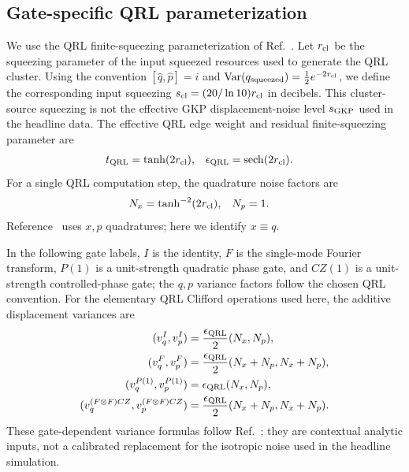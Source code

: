 \documentclass[aps,
prx,
superscriptaddress,
reprint,
longbibliography,
floatfix]{revtex4-2}
\begin{document}
\subsection{Gate-specific QRL parameterization}

We use the QRL finite-squeezing parameterization of Ref.~\cite{MenicucciQRL2020}. Let $r_{\rm cl}$ be the squeezing parameter of the input squeezed resources used to generate the QRL cluster. Using the convention $[\hat q,\hat p]=i$ and $\mathrm{Var}(q_{\rm squeezed})=\tfrac12 e^{-2r_{\rm cl}}$, we define the corresponding input squeezing $s_{\rm cl}=(20/\ln 10)r_{\rm cl}$ in decibels. This cluster-source squeezing is not the effective GKP displacement-noise level $s_{\rm GKP}$ used in the headline data. The effective QRL edge weight and residual finite-squeezing parameter are
\begin{align}
 t_{\rm QRL} &= \tanh(2r_{\rm cl}),
&
 \epsilon_{\rm QRL} &= \operatorname{sech}(2r_{\rm cl}).
\label{eq:qrl_t_epsilon}
\end{align}
For a single QRL computation step, the quadrature noise factors are
\begin{align}
 N_x &= \tanh^{-2}(2r_{\rm cl}),
&
 N_p &= 1 .
\label{eq:qrl_noise_factors}
\end{align}
Reference~\cite{MenicucciQRL2020} uses $x,p$ quadratures; here we identify $x\equiv q$.

In the following gate labels, $I$ is the identity, $F$ is the single-mode Fourier transform, $P(1)$ is a unit-strength quadratic phase gate, and $CZ(1)$ is a unit-strength controlled-phase gate; the $q,p$ variance factors follow the chosen QRL convention. For the elementary QRL Clifford operations used here, the additive displacement variances are
\begin{align}
(v_q^I,v_p^I)&=\frac{\epsilon_{\rm QRL}}{2}(N_x,N_p),\\
(v_q^F,v_p^F)&=\frac{\epsilon_{\rm QRL}}{2}(N_x+N_p,N_x+N_p),\\
(v_q^{P(1)},v_p^{P(1)})&=\epsilon_{\rm QRL}(N_x,N_p),\\
(v_q^{(F\otimes F)CZ},v_p^{(F\otimes F)CZ})&=\frac{\epsilon_{\rm QRL}}{2}(N_x+N_p,N_x+N_p).
\label{eq:qrl_operation_variances}
\end{align}
These gate-dependent variance formulas follow Ref.~\cite{MenicucciQRL2020}; they are contextual analytic inputs, not a calibrated replacement for the isotropic noise used in the headline simulation.
\end{document}
